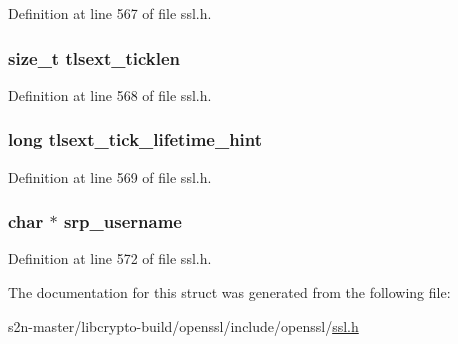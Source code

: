 Definition at line 567 of file ssl.\+h.

\subsubsection[{\texorpdfstring{tlsext\+\_\+ticklen}{tlsext_ticklen}}]{\setlength{\rightskip}{0pt plus 5cm}size\+\_\+t tlsext\+\_\+ticklen}\hypertarget{structssl__session__st_a63b349a501827d1859b8618720b88ea7}{}\label{structssl__session__st_a63b349a501827d1859b8618720b88ea7}


Definition at line 568 of file ssl.\+h.

\subsubsection[{\texorpdfstring{tlsext\+\_\+tick\+\_\+lifetime\+\_\+hint}{tlsext_tick_lifetime_hint}}]{\setlength{\rightskip}{0pt plus 5cm}long tlsext\+\_\+tick\+\_\+lifetime\+\_\+hint}\hypertarget{structssl__session__st_a1648585ecfc2c21279f79b806205cd05}{}\label{structssl__session__st_a1648585ecfc2c21279f79b806205cd05}


Definition at line 569 of file ssl.\+h.

\subsubsection[{\texorpdfstring{srp\+\_\+username}{srp_username}}]{\setlength{\rightskip}{0pt plus 5cm}char $\ast$ srp\+\_\+username}\hypertarget{structssl__session__st_a39074003a093c860411bdca8e01419d4}{}\label{structssl__session__st_a39074003a093c860411bdca8e01419d4}


Definition at line 572 of file ssl.\+h.



The documentation for this struct was generated from the following file\+:\begin{DoxyCompactItemize}
\item 
s2n-\/master/libcrypto-\/build/openssl/include/openssl/\hyperlink{include_2openssl_2ssl_8h}{ssl.\+h}\end{DoxyCompactItemize}
